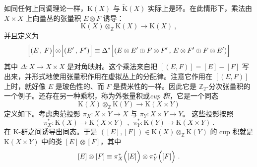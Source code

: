 \documentclass[11pt,a4paper]{ctexart}
\begin{document}
如同任何上同调理论一样，\({\mathrm K}(X)\) 与 \(\widetilde{{\mathrm K}}(X)\) 实际上是环。在此情形下，乘法由 \(X\times X\) 上向量丛的张量积 \(E\otimes F\) 诱导： \[{\mathrm K}(X)\otimes_{{\mathbb{Z}}}{\mathrm K}(X)\longrightarrow{\mathrm K}(X)\ ,\] 并且定义为 \[\Bigl[(E\,,\,F)\Bigl]\otimes\Bigl[(E'\,,\,F')\Bigr]\equiv
\Delta^*\Bigl[(E\otimes E'\oplus F\otimes F'\,,\, E\otimes F'\oplus F\otimes
E')\Bigr]\] 其中 \(\Delta:X\to X\times X\) 是对角映射。这个乘法来自把 \([(E,F)]=[E]-[F]\) 写出来，并形式地使用张量积作用在虚拟丛上的分配律。注意它作用在 \([(E,F)]\) 上时，就好像 \(E\) 是玻色性的、而 \(F\) 是费米性的一样。因此它是 \({\mathbb{Z}}_2\)-分次张量积的一个例子。还存在另一种乘积，称为外张量积或\emph{cup 积}，它是一个同态 \[{\mathrm K}(X)\otimes_{{\mathbb{Z}}}{\mathrm K}(Y)\longrightarrow {\mathrm K}(X\times Y)\] 定义如下。考虑典范投影 \(\pi_{X}:X\times Y\rightarrow X\) 与 \(\pi_Y:X\times Y\rightarrow Y\)。 这些投影按照 \[\pi_X^{*}:{\mathrm K}(X)\rightarrow {\mathrm K}(X\times Y)\ \ , \ \
\pi_Y^{*}:{\mathrm K}(Y)\rightarrow {\mathrm K}(X\times Y)\ .\] 在 K-群之间诱导出同态。于是 \(([E],[F])\in {\mathrm K}(X)\otimes_{\mathbb{Z}}{\mathrm K}(Y)\) 的 cup 积就是 \({\mathrm K}(X\times Y)\) 中的类 \([E]\otimes [F]\)，其中 \[[E]\otimes [F]\equiv\pi_X^{*}\Bigl([E]\Bigr)\otimes \pi_Y^{*}\Bigl([F]\Bigr)\ .\]
\end{document}
